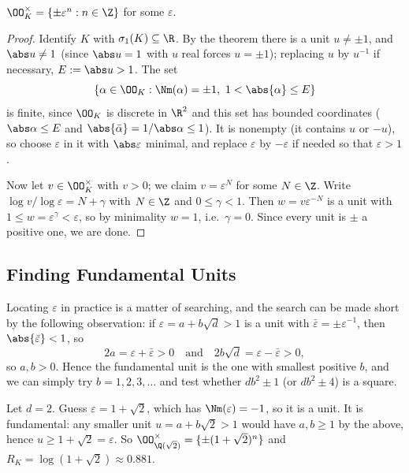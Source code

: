 \begin{corollary}
	$\OO_K^\times = \{\pm\varepsilon^n : n \in \Z\}$ for some $\varepsilon$.
\end{corollary}

\begin{proof}
	Identify $K$ with $\sigma_1(K)\subseteq\R$. By the theorem there is a unit $u \neq \pm1$, and $\abs u \neq 1$ (since $\abs u = 1$ with $u$ real forces $u = \pm1$); replacing $u$ by $u^{-1}$ if necessary, $E := \abs u > 1$. The set
	$$\left\{\alpha \in \OO_K : \Nm(\alpha) = \pm1,\ 1 < \abs{\alpha}\le E\right\}$$
	is finite, since $\OO_K$ is discrete in $\R^2$ and this set has bounded coordinates ($\abs\alpha \le E$ and $\abs{\bar\alpha} = 1/\abs\alpha \le 1$). It is nonempty (it contains $u$ or $-u$), so choose $\varepsilon$ in it with $\abs\varepsilon$ minimal, and replace $\varepsilon$ by $-\varepsilon$ if needed so that $\varepsilon > 1$.

	Now let $v \in \OO_K^\times$ with $v > 0$; we claim $v = \varepsilon^N$ for some $N \in \Z$. Write $\log v/\log\varepsilon = N + \gamma$ with $N \in \Z$ and $0 \le \gamma < 1$. Then $w = v\varepsilon^{-N}$ is a unit with $1 \le w = \varepsilon^{\gamma} < \varepsilon$, so by minimality $w = 1$, i.e.\ $\gamma = 0$. Since every unit is $\pm$ a positive one, we are done.
\end{proof}

\subsection{Finding Fundamental Units}

Locating $\varepsilon$ in practice is a matter of searching, and the search can be made short by the following observation: if $\varepsilon = a+b\sqrt d > 1$ is a unit with $\bar\varepsilon = \pm\varepsilon^{-1}$, then $\abs{\bar\varepsilon}<1$, so
$$2a = \varepsilon+\bar\varepsilon > 0 \quad\text{and}\quad 2b\sqrt d = \varepsilon - \bar\varepsilon > 0,$$
so $a, b > 0$. Hence the fundamental unit is the one with smallest positive $b$, and we can simply try $b = 1, 2, 3, \dots$ and test whether $db^2\pm1$ (or $db^2\pm4$) is a square.

\begin{example}
	Let $d = 2$. Guess $\varepsilon = 1+\sqrt2$, which has $\Nm(\varepsilon) = -1$, so it is a unit. It is fundamental: any smaller unit $u = a+b\sqrt2 > 1$ would have $a, b \geq 1$ by the above, hence $u \geq 1+\sqrt2 = \varepsilon$. So $\OO_{\Q(\sqrt2)}^\times = \{\pm(1+\sqrt2)^n\}$ and $R_K = \log(1+\sqrt2) \approx 0.881$.
\end{example}

